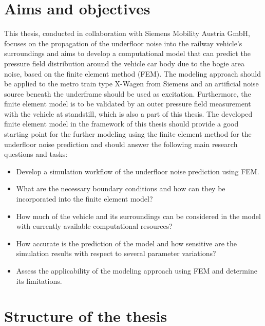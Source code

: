 \section{Aims and objectives}

This thesis, conducted in collaboration with Siemens Mobility Austria GmbH, focuses on the propagation of the underfloor noise into the railway vehicle's surroundings and aims to develop a computational model that can predict the pressure field distribution around the vehicle car body due to the bogie area noise, based on the finite element method (FEM).
The modeling approach should be applied to the metro train type X-Wagen from Siemens and an artificial noise source beneath the underframe should be used as excitation.
Furthermore, the finite element model is to be validated by an outer pressure field measurement with the vehicle at standstill, which is also a part of this thesis.
The developed finite element model in the framework of this thesis should provide a good starting point for the further modeling using the finite element method for the underfloor noise prediction and should answer the following main research questions and tasks:
\begin{itemize}
	\item Develop a simulation workflow of the underfloor noise prediction using FEM.
	\item What are the necessary boundary conditions and how can they be incorporated into the finite element model?
	\item How much of the vehicle and its surroundings can be considered in the model with currently available computational resources?
	\item How accurate is the prediction of the model and how sensitive are the simulation results with respect to several parameter variations?
	\item Assess the applicability of the modeling approach using FEM and determine its limitations.
\end{itemize}

\section{Structure of the thesis}

